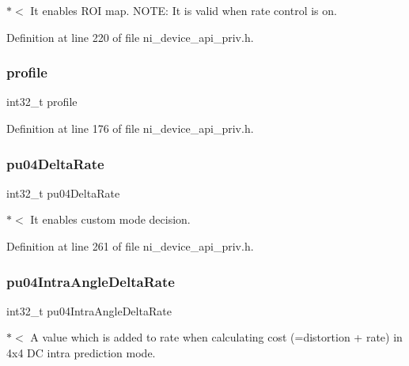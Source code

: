 $\ast$$<$ It enables R\+OI map. N\+O\+TE\+: It is valid when rate control is on. 

Definition at line 220 of file ni\+\_\+device\+\_\+api\+\_\+priv.\+h.

\mbox{\label{struct__ni__t408__config__t_affcdae80c74d5751541b067c5ab1a861}} 
\subsubsection{\texorpdfstring{profile}{profile}}
{\footnotesize\ttfamily int32\+\_\+t profile}



Definition at line 176 of file ni\+\_\+device\+\_\+api\+\_\+priv.\+h.

\mbox{\label{struct__ni__t408__config__t_aa7b51ac4288bcb3f1a012985bd910ab7}} 
\subsubsection{\texorpdfstring{pu04DeltaRate}{pu04DeltaRate}}
{\footnotesize\ttfamily int32\+\_\+t pu04\+Delta\+Rate}

$\ast$$<$ It enables custom mode decision. 

Definition at line 261 of file ni\+\_\+device\+\_\+api\+\_\+priv.\+h.

\mbox{\label{struct__ni__t408__config__t_a7342e12a9bcee0daedf452ac3ba68724}} 
\subsubsection{\texorpdfstring{pu04IntraAngleDeltaRate}{pu04IntraAngleDeltaRate}}
{\footnotesize\ttfamily int32\+\_\+t pu04\+Intra\+Angle\+Delta\+Rate}

$\ast$$<$ A value which is added to rate when calculating cost (=distortion + rate) in 4x4 DC intra prediction mode. 

